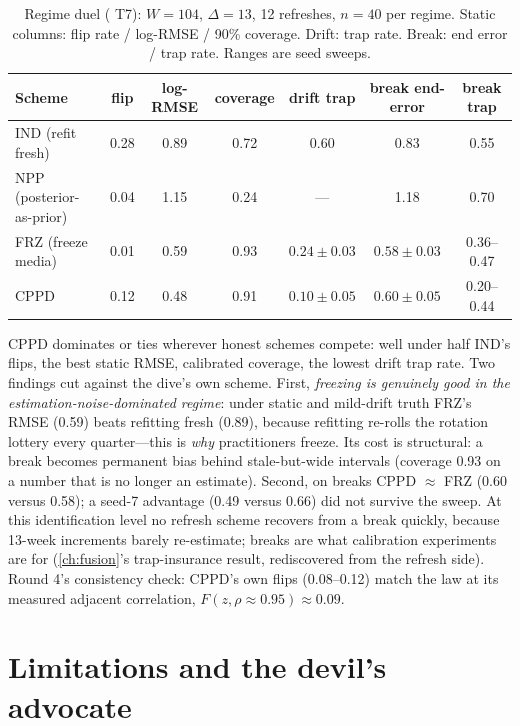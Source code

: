 \begin{table}[htbp]
\centering\small
\caption{Regime duel ( T7): $W = 104$, $\Delta = 13$, 12 refreshes, $n = 40$ per regime. Static columns: flip rate / log-RMSE / 90\% coverage. Drift: trap rate. Break: end error / trap rate. Ranges are seed sweeps.}
\label{refresh:tab:duel}
\begin{tabular}{lcccccc}
\toprule
Scheme & flip & log-RMSE & coverage & drift trap & break end-error & break trap \\
\midrule
IND (refit fresh) & 0.28 & 0.89 & 0.72 & 0.60 & 0.83 & 0.55 \\
NPP (posterior-as-prior) & 0.04 & 1.15 & 0.24 & --- & 1.18 & 0.70 \\
FRZ (freeze media) & 0.01 & 0.59 & 0.93 & $0.24 \pm 0.03$ & $0.58 \pm 0.03$ & 0.36--0.47 \\
CPPD & 0.12 & 0.48 & 0.91 & $0.10 \pm 0.05$ & $0.60 \pm 0.05$ & 0.20--0.44 \\
\bottomrule
\end{tabular}
\end{table}

CPPD dominates or ties wherever honest schemes compete: well under half IND's flips, the best static RMSE, calibrated coverage, the lowest drift trap rate. Two findings cut against the dive's own scheme. First, \emph{freezing is genuinely good in the estimation-noise-dominated regime}: under static and mild-drift truth FRZ's RMSE (0.59) beats refitting fresh (0.89), because refitting re-rolls the rotation lottery every quarter---this is \emph{why} practitioners freeze. Its cost is structural: a break becomes permanent bias behind stale-but-wide intervals (coverage 0.93 on a number that is no longer an estimate). Second, on breaks CPPD $\approx$ FRZ (0.60 versus 0.58); a seed-7 advantage (0.49 versus 0.66) did not survive the sweep. At this identification level no refresh scheme recovers from a break quickly, because 13-week increments barely re-estimate; breaks are what calibration experiments are for (\cref{ch:fusion}'s trap-insurance result, rediscovered from the refresh side). Round 4's consistency check: CPPD's own flips (0.08--0.12) match the law at its measured adjacent correlation, $F(z, \rho \approx 0.95) \approx 0.09$.

\section{Limitations and the devil's advocate}

